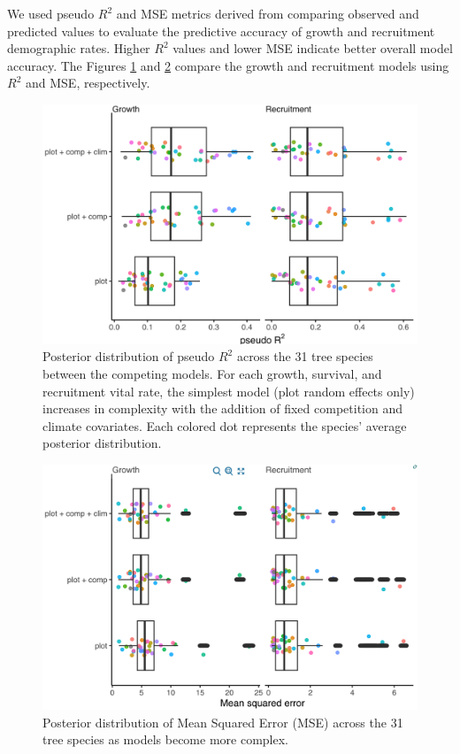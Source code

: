 We used pseudo \(R^2\) and MSE metrics derived from comparing observed
and predicted values to evaluate the predictive accuracy of growth and
recruitment demographic rates. Higher \(R^2\) values and lower MSE
indicate better overall model accuracy. The Figures \ref{fig:R2} and
\ref{fig:MSE} compare the growth and recruitment models using \(R^2\)
and MSE, respectively.\\

\hypertarget{fig:R2}{%
\begin{figure}
\centering
\includegraphics{manuscript/figs/supp1_2.png}
\caption[{Posterior distribution of pseudo \(R^2\) across the 31 tree
species between the competing models.}]{Posterior distribution of pseudo
\(R^2\) across the 31 tree species between the competing models. For
each growth, survival, and recruitment vital rate, the simplest model
(plot random effects only) increases in complexity with the addition of
fixed competition and climate covariates. Each colored dot represents
the species' average posterior distribution.}
\label{fig:R2}
\end{figure}
}

\hypertarget{fig:MSE}{%
\begin{figure}
\centering
\includegraphics{manuscript/figs/supp1_3.png}
\caption[{Posterior distribution of Mean Squared Error (MSE) across the
31 tree species as models become more complex.}]{Posterior distribution
of Mean Squared Error (MSE) across the 31 tree species as models become
more complex.}
\label{fig:MSE}
\end{figure}
}

